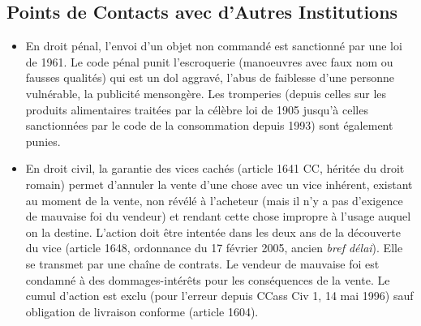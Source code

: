 \documentclass[math]{cours}
\begin{document}
\subsection{Points de Contacts avec d'Autres Institutions}
\begin{itemize}
	\item En droit pénal, l'envoi d'un objet non commandé est sanctionné par une loi de 1961.
		Le code pénal punit l'escroquerie (manoeuvres avec faux nom ou fausses qualités) qui est un dol aggravé, l'abus de faiblesse d'une personne vulnérable, la publicité mensongère.
		Les tromperies (depuis celles sur les produits alimentaires traitées par la célèbre loi de 1905 jusqu'à celles sanctionnées par le code de la consommation depuis 1993) sont également punies.
	\item En droit civil, la garantie des vices cachés (article 1641 CC, héritée du droit romain) permet d'annuler la vente d'une chose avec un vice inhérent, existant au moment de la vente, non révélé à l'acheteur (mais il n'y a pas d'exigence de mauvaise foi du vendeur) et rendant cette chose impropre à l'usage auquel on la destine.
		L'action doit être intentée dans les deux ans de la découverte du vice (article 1648, ordonnance du 17 février 2005, ancien \emph{bref délai}). Elle se transmet par une chaîne de contrats.
		Le vendeur de mauvaise foi est condamné à des dommages-intérêts pour les conséquences de la vente.
		Le cumul d'action est exclu (pour l'erreur depuis CCass Civ 1, 14 mai 1996) sauf obligation de livraison conforme (article 1604).
\end{itemize}
\end{document}
